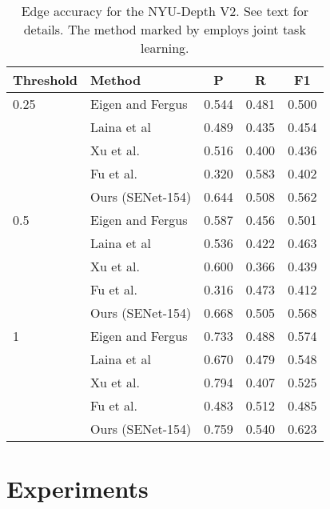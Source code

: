 \documentclass[10pt,twocolumn,letterpaper]{article}
\begin{document}
\setlength{\tabcolsep}{3.4pt}
\begin{table}[!t]
\begin{center}
\caption{Edge accuracy for the NYU-Depth V2. See text for details. The method marked by  employs joint task learning.
}\label{nyu_shape}
\begin{tabular}{|l|l|c|c|c|}
\hline
Threshold &Method&P & R &F1 \\
\hline\hline
0.25 
&Eigen and Fergus \protect\cite{Eigen2015PredictingDS} &0.544&0.481&0.500\\
&Laina et al \protect\cite{laina2016deeper}  &0.489 &0.435 &0.454 \\
&Xu et al. \cite{Xu2017MultiscaleCC} &0.516 &0.400 &0.436 \\
&Fu et al. \cite{fu2018deep} &0.320 &0.583 &0.402 \\ 
&Ours (SENet-154)   &0.644 &0.508 &0.562 \\
\hline
0.5
&Eigen and Fergus \protect\cite{Eigen2015PredictingDS} &0.587&0.456&0.501\\
&Laina et al \protect\cite{laina2016deeper}&0.536&0.422&0.463\\
&Xu et al. \cite{Xu2017MultiscaleCC} &0.600 &0.366 &0.439 \\
&Fu et al. \cite{fu2018deep} &0.316 &0.473 &0.412 \\
&Ours (SENet-154)       &0.668 &0.505 &0.568 \\
\hline
1
&Eigen and Fergus \protect\cite{Eigen2015PredictingDS} &0.733&0.488&0.574\\
&Laina et al \protect\cite{laina2016deeper}&0.670&0.479&0.548\\
&Xu et al. \cite{Xu2017MultiscaleCC} &0.794 &0.407 &0.525 \\
&Fu et al. \cite{fu2018deep} &0.483 &0.512 &0.485 \\
&Ours (SENet-154)        &0.759 &0.540 &0.623 \\
\hline
\end{tabular}
\end{center}
\end{table}
\setlength{\tabcolsep}{1.4pt}



\section{Experiments}
\end{document}
